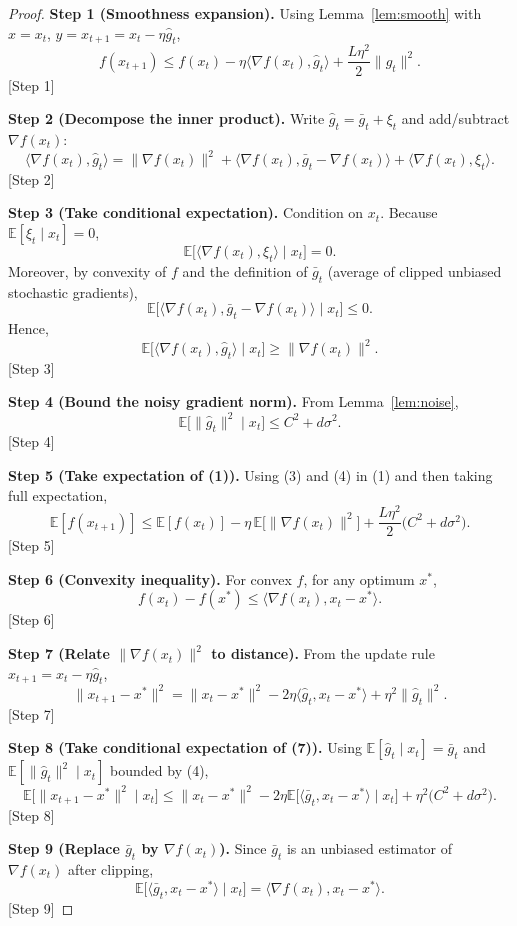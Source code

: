 \documentclass{article}
\newcommand{\EE}{\mathbb{E}}
\begin{document}
\begin{proof}
\textbf{Step 1 (Smoothness expansion).}  
Using Lemma~\ref{lem:smooth} with $x=x_t$, $y=x_{t+1}=x_t-\eta\hat g_t$,
\[
f(x_{t+1})\le f(x_t)-\eta\langle\nabla f(x_t),\hat g_t\rangle
+\frac{L\eta^{2}}{2}\|\hat g_t\|^{2}. \tag{1}
\] 
[Step 1]

\textbf{Step 2 (Decompose the inner product).}  
Write $\hat g_t=\bar g_t+\xi_t$ and add/subtract $\nabla f(x_t)$:
\[
\langle\nabla f(x_t),\hat g_t\rangle
= \|\nabla f(x_t)\|^{2}
+ \langle\nabla f(x_t),\bar g_t-\nabla f(x_t)\rangle
+ \langle\nabla f(x_t),\xi_t\rangle. \tag{2}
\] 
[Step 2]

\textbf{Step 3 (Take conditional expectation).}  
Condition on $x_t$. Because $\EE[\xi_t\mid x_t]=0$,
\[
\EE\!\bigl[\langle\nabla f(x_t),\xi_t\rangle\mid x_t\bigr]=0.
\] 
Moreover, by convexity of $f$ and the definition of $\bar g_t$ (average of
clipped unbiased stochastic gradients),
\[
\EE\!\bigl[\langle\nabla f(x_t),\bar g_t-\nabla f(x_t)\rangle\mid x_t\bigr]\le 0.
\] 
Hence,
\[
\EE\!\bigl[\langle\nabla f(x_t),\hat g_t\rangle\mid x_t\bigr]
\ge \|\nabla f(x_t)\|^{2}. \tag{3}
\] 
[Step 3]

\textbf{Step 4 (Bound the noisy gradient norm).}  
From Lemma~\ref{lem:noise},
\[
\EE\!\bigl[\|\hat g_t\|^{2}\mid x_t\bigr]\le C^{2}+d\sigma^{2}. \tag{4}
\] 
[Step 4]

\textbf{Step 5 (Take expectation of (1)).}  
Using (3) and (4) in (1) and then taking full expectation,
\[
\EE[f(x_{t+1})]\le
\EE[f(x_t)]-\eta\,\EE\!\bigl[\|\nabla f(x_t)\|^{2}\bigr]
+\frac{L\eta^{2}}{2}\bigl(C^{2}+d\sigma^{2}\bigr). \tag{5}
\] 
[Step 5]

\textbf{Step 6 (Convexity inequality).}  
For convex $f$, for any optimum $x^{*}$,
\[
f(x_t)-f(x^{*})\le\langle\nabla f(x_t),x_t-x^{*}\rangle. \tag{6}
\] 
[Step 6]

\textbf{Step 7 (Relate $\|\nabla f(x_t)\|^{2}$ to distance).}  
From the update rule $x_{t+1}=x_t-\eta\hat g_t$,
\[
\|x_{t+1}-x^{*}\|^{2}
= \|x_t-x^{*}\|^{2}
-2\eta\langle\hat g_t,x_t-x^{*}\rangle
+\eta^{2}\|\hat g_t\|^{2}. \tag{7}
\] 
[Step 7]

\textbf{Step 8 (Take conditional expectation of (7)).}  
Using $\EE[\hat g_t\mid x_t]=\bar g_t$ and $\EE[\|\hat g_t\|^{2}\mid x_t]$
bounded by (4),
\[
\EE\!\bigl[\|x_{t+1}-x^{*}\|^{2}\mid x_t\bigr]
\le \|x_t-x^{*}\|^{2}
-2\eta\EE\!\bigl[\langle\bar g_t,x_t-x^{*}\rangle\mid x_t\bigr]
+\eta^{2}\bigl(C^{2}+d\sigma^{2}\bigr). \tag{8}
\] 
[Step 8]

\textbf{Step 9 (Replace $\bar g_t$ by $\nabla f(x_t)$).}  
Since $\bar g_t$ is an unbiased estimator of $\nabla f(x_t)$ after clipping,
\[
\EE\!\bigl[\langle\bar g_t,x_t-x^{*}\rangle\mid x_t\bigr]
= \langle\nabla f(x_t),x_t-x^{*}\rangle. \tag{9}
\] 
[Step 9]


\end{proof}
\end{document}
